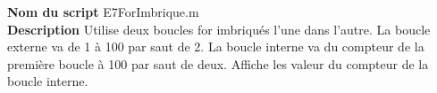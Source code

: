 \textbf{Nom du script}
E7ForImbrique.m\\
\textbf{Description}
Utilise deux boucles for imbriqués l'une dans l'autre. La boucle externe va de 1 à 100 par saut de 2. La boucle interne va du compteur de la première boucle à 100 par saut de deux. Affiche les valeur du compteur de la boucle interne.
